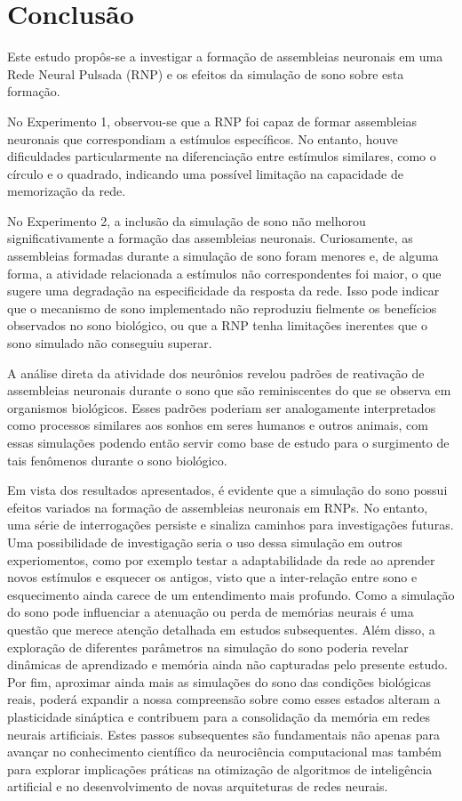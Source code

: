 \chapter{Conclusão}\label{cap_conclusao}

Este estudo propôs-se a investigar a formação de assembleias neuronais em uma Rede Neural Pulsada (RNP) e os efeitos da simulação
de sono sobre esta formação.

No Experimento 1, observou-se que a RNP foi capaz de formar assembleias neuronais que correspondiam a estímulos específicos. No
entanto, houve dificuldades particularmente na diferenciação entre estímulos similares, como o círculo e o quadrado, indicando uma
possível limitação na capacidade de memorização da rede.

No Experimento 2, a inclusão da simulação de sono não melhorou significativamente a formação das assembleias neuronais.
Curiosamente, as assembleias formadas durante a simulação de sono foram menores e, de alguma forma, a atividade relacionada a
estímulos não correspondentes foi maior, o que sugere uma degradação na especificidade da resposta da rede. Isso pode indicar que
o mecanismo de sono implementado não reproduziu fielmente os benefícios observados no sono biológico, ou que a RNP tenha
limitações inerentes que o sono simulado não conseguiu superar.

A análise direta da atividade dos neurônios revelou padrões de reativação de assembleias neuronais durante o sono que são
reminiscentes do que se observa em organismos biológicos. Esses padrões poderiam ser analogamente interpretados como processos
similares aos sonhos em seres humanos e outros animais, com essas simulações podendo então servir como base de estudo para o
surgimento de tais fenômenos durante o sono biológico.

Em vista dos resultados apresentados, é evidente que a simulação do sono possui efeitos variados na formação de assembleias
neuronais em RNPs. No entanto, uma série de interrogações persiste e sinaliza caminhos para investigações futuras. Uma
possibilidade de investigação seria o uso dessa simulação em outros experiomentos, como por exemplo testar a adaptabilidade da
rede ao aprender novos estímulos e esquecer os antigos, visto que a inter-relação entre sono e esquecimento ainda carece de um
entendimento mais profundo. Como a simulação do sono pode influenciar a atenuação ou perda de memórias neurais é uma questão que
merece atenção detalhada em estudos subsequentes. Além disso, a exploração de diferentes parâmetros na simulação do sono poderia
revelar dinâmicas de aprendizado e memória ainda não capturadas pelo presente estudo. Por fim, aproximar ainda mais as simulações
do sono das condições biológicas reais, poderá expandir a nossa compreensão sobre como esses estados alteram a plasticidade
sináptica e contribuem para a consolidação da memória em redes neurais artificiais. Estes passos subsequentes são fundamentais não
apenas para avançar no conhecimento científico da neurociência computacional mas também para explorar implicações práticas na
otimização de algoritmos de inteligência artificial e no desenvolvimento de novas arquiteturas de redes neurais.
